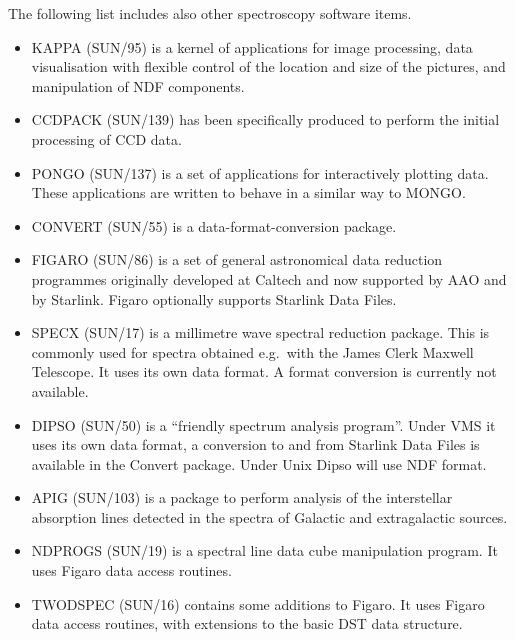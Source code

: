 The following list includes also other spectroscopy software items.

\begin{itemize}

\item KAPPA (SUN/95) is a kernel of applications for image processing,
   data visualisation with flexible control of the location and size of
   the pictures, and manipulation of NDF components.

\item CCDPACK (SUN/139) has been specifically produced to perform the
   initial processing of CCD data.

\item PONGO (SUN/137) is a set of applications for interactively
   plotting data. These applications are written to behave in a similar
   way to MONGO.

\item CONVERT (SUN/55) is a data-format-conversion package.

\item FIGARO (SUN/86) is a set of general astronomical data reduction
   programmes originally developed at Caltech and now supported by AAO
   and by Starlink. Figaro optionally supports Starlink Data Files.

\item SPECX (SUN/17) is a millimetre wave spectral reduction package.
   This is commonly used for spectra obtained e.g.\ with the James Clerk
   Maxwell Telescope. It uses its own data format. A format conversion
   is currently not available.

\item DIPSO (SUN/50) is a ``friendly spectrum analysis program''.  Under
   VMS it uses its own data format, a conversion to and from Starlink
   Data Files is available in the Convert package. Under Unix Dipso will
   use NDF format.

\item APIG (SUN/103) is a package to perform analysis of the
   interstellar absorption lines detected in the spectra of Galactic and
   extragalactic sources.

\item NDPROGS (SUN/19) is a spectral line data cube manipulation
   program. It uses Figaro data access routines.

\item TWODSPEC (SUN/16) contains some additions to Figaro. It uses
   Figaro data access routines, with extensions to the basic DST data
   structure.


\end{itemize}
